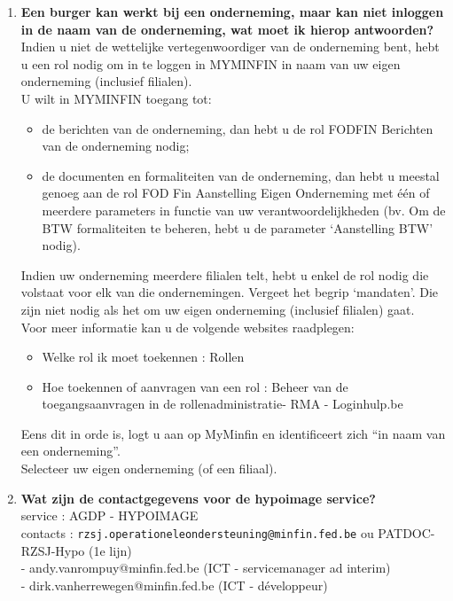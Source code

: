 \begin{enumerate}
        \item \textbf{Een burger kan werkt bij een onderneming, maar kan niet inloggen in de naam van de onderneming, wat moet ik hierop antwoorden?} \\
        Indien u niet de wettelijke vertegenwoordiger van de onderneming bent, hebt u een rol nodig om in te loggen in MYMINFIN in naam van uw eigen onderneming (inclusief filialen).\\
        U wilt in MYMINFIN toegang tot:
        \begin{itemize}
            \item de berichten van de onderneming, dan hebt u de rol FODFIN Berichten van de onderneming nodig;
            \item de documenten en formaliteiten van de onderneming, dan hebt u meestal genoeg aan de rol FOD Fin Aanstelling Eigen Onderneming met één of meerdere parameters in functie van uw verantwoordelijkheden (bv. Om de BTW formaliteiten te beheren, hebt u de parameter ‘Aanstelling BTW' nodig).
            \end{itemize}
Indien uw onderneming meerdere filialen telt, hebt u enkel de rol nodig die volstaat voor elk van die ondernemingen. Vergeet het begrip ‘mandaten'. Die zijn niet nodig als het om uw eigen onderneming (inclusief filialen) gaat.\\
Voor meer informatie kan u de volgende websites raadplegen:
\begin{itemize}
\item Welke rol ik moet toekennen : Rollen
\item Hoe toekennen of aanvragen van een rol : Beheer van de toegangsaanvragen in de rollenadministratie- RMA - Loginhulp.be
\end{itemize}
Eens dit in orde is, logt u aan op MyMinfin en identificeert zich “in naam van een onderneming”.\\
Selecteer uw eigen onderneming (of een filiaal).

\item \textbf{Wat zijn de contactgegevens voor de hypoimage service?} \\
service : AGDP - HYPOIMAGE \\
contacts : \texttt{rzsj.operationeleondersteuning@minfin.fed.be} ou PATDOC-RZSJ-Hypo (1e lijn) \\
- andy.vanrompuy@minfin.fed.be (ICT - servicemanager ad interim) \\
- dirk.vanherrewegen@minfin.fed.be (ICT - développeur)
\end{enumerate}
